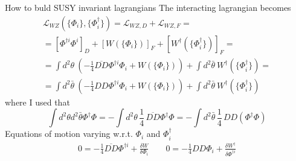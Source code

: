 \documentclass[10pt]{beamer}
\begin{document}
\begin{frame}{How to buld SUSY invariant lagrangians}
The interacting lagrangian becomes
\begin{gather*}
\mathcal{L}_{WZ}\left(\{\Phi_i\}, \{\Phi^{\dagger}_i\}\right) = \mathcal{L}_{WZ,D} + \mathcal{L}_{WZ,F} = \\
= \left[\Phi^{\dagger i}\Phi^i\right]_D + \left[W(\{\Phi_i\})\right]_F +  \left[W^{\dagger}(\{\Phi^{\dagger}_i\})\right]_F = \\
= \int d^2\theta \ \left(-\frac{1}{4}\overline{DD}\Phi^{\dagger i}\Phi_i + W(\{\Phi_i\})\right) + \int d^2\bar\theta \ W^{\dagger}(\{\Phi^{\dagger}_i\}) = \\
= \int d^2\bar\theta \ \left(-\frac{1}{4}{DD}\Phi^{\dagger i}\Phi_i + W(\{\Phi_i\})\right) + \int d^2\bar\theta \ W^{\dagger}(\{\Phi^{\dagger}_i\})
\end{gather*}
where I used that 
\begin{equation*}
    \int d^2\theta d^2\bar\theta \Phi^{\dagger}\Phi = - \int d^2\theta \, \frac{1}{4} \, \overline{DD}\Phi^\dagger\Phi = - \int d^2\bar\theta \, \frac{1}{4} \, DD(\Phi^{\dagger}\Phi) 
\end{equation*}
Equations of motion varying w.r.t. $\Phi_i$ and $\Phi_i^{\dagger}$
\begin{gather*}
    0=-\frac{1}{4} \overline{D D} \Phi^{\dagger i}+\frac{\delta W}{\delta \Phi_{i}} \qquad
    0=-\frac{1}{4} D D \Phi_{i}+\frac{\delta W^{\dagger}}{\delta \Phi^{\dagger i}}
\end{gather*}
\end{frame}
\end{document}

